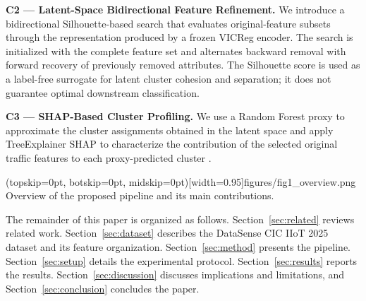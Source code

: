 \textbf{C2 --- Latent-Space Bidirectional Feature Refinement.} We introduce a bidirectional Silhouette-based search that evaluates original-feature subsets through the representation produced by a frozen VICReg encoder. The search is initialized with the complete feature set and alternates backward removal with forward recovery of previously removed attributes. The Silhouette score is used as a label-free surrogate for latent cluster cohesion and separation; it does not guarantee optimal downstream classification.

\textbf{C3 --- SHAP-Based Cluster Profiling.} We use a Random Forest proxy to approximate the cluster assignments obtained in the latent space and apply TreeExplainer SHAP to characterize the contribution of the selected original traffic features to each proxy-predicted cluster \cite{lundberg2017unified}. 

\Figure[t!](topskip=0pt, botskip=0pt, midskip=0pt)[width=0.95\textwidth]{figures/fig1_overview.png}
{Overview of the proposed \method{} pipeline and its main contributions.\label{fig:overview}}



The remainder of this paper is organized as follows. Section~\ref{sec:related} reviews related work. Section~\ref{sec:dataset} describes the DataSense CIC IIoT 2025 dataset and its feature organization. Section~\ref{sec:method} presents the \method{} pipeline. Section~\ref{sec:setup} details the experimental protocol. Section~\ref{sec:results} reports the results. Section~\ref{sec:discussion} discusses implications and limitations, and Section~\ref{sec:conclusion} concludes the paper.
